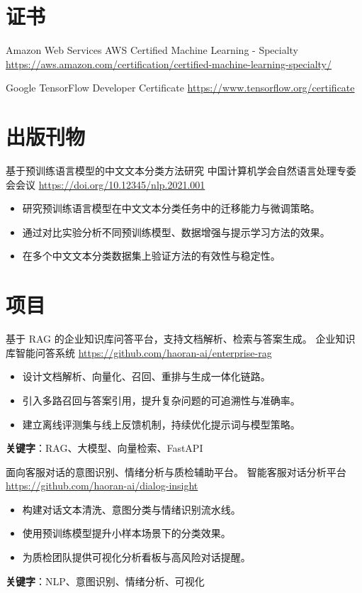 \documentclass[a4paper, serif, 10pt]{moderncv}
\begin{document}
\section{证书}

        {Amazon Web Services}
        {AWS Certified Machine Learning - Specialty}
        {\url{https://aws.amazon.com/certification/certified-machine-learning-specialty/}}
        {}
        {}

        {Google}
        {TensorFlow Developer Certificate}
        {\url{https://www.tensorflow.org/certificate}}
        {}
        {}
\section{出版刊物}

        {基于预训练语言模型的中文文本分类方法研究}
        {中国计算机学会自然语言处理专委会会议}
        {\url{https://doi.org/10.12345/nlp.2021.001}}
        {}
        {\begin{itemize}
\item 研究预训练语言模型在中文文本分类任务中的迁移能力与微调策略。
\item 通过对比实验分析不同预训练模型、数据增强与提示学习方法的效果。
\item 在多个中文文本分类数据集上验证方法的有效性与稳定性。
\end{itemize}}
\section{项目}

        {基于 RAG 的企业知识库问答平台，支持文档解析、检索与答案生成。}
        {企业知识库智能问答系统}
        {\url{https://github.com/haoran-ai/enterprise-rag}}
        {}
        {\begin{itemize}
\item 设计文档解析、向量化、召回、重排与生成一体化链路。
\item 引入多路召回与答案引用，提升复杂问题的可追溯性与准确率。
\item 建立离线评测集与线上反馈机制，持续优化提示词与模型策略。
\end{itemize}
\textbf{关键字}：RAG、大模型、向量检索、FastAPI}

        {面向客服对话的意图识别、情绪分析与质检辅助平台。}
        {智能客服对话分析平台}
        {\url{https://github.com/haoran-ai/dialog-insight}}
        {}
        {\begin{itemize}
\item 构建对话文本清洗、意图分类与情绪识别流水线。
\item 使用预训练模型提升小样本场景下的分类效果。
\item 为质检团队提供可视化分析看板与高风险对话提醒。
\end{itemize}
\textbf{关键字}：NLP、意图识别、情绪分析、可视化}
\end{document}
